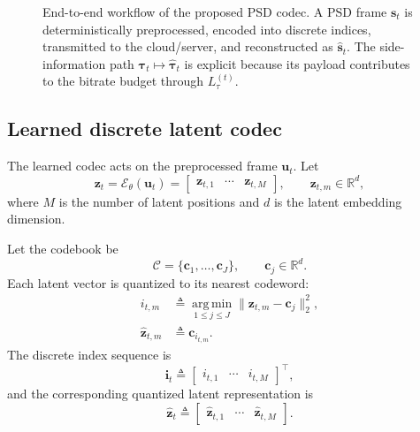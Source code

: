 \documentclass[11pt]{article}
\begin{document}
\begin{figure}[t]
\begin{tikzpicture}
\end{tikzpicture}
\caption{
End-to-end workflow of the proposed PSD codec. A PSD frame $\mathbf{s}_t$ is deterministically
preprocessed, encoded into discrete indices, transmitted to the cloud/server, and reconstructed as
$\hat{\mathbf{s}}_t$. The side-information path
$\boldsymbol{\tau}_t \mapsto \hat{\boldsymbol{\tau}}_t$ is explicit because its payload contributes
to the bitrate budget through $L_{\tau}^{(t)}$.
}
\label{fig:psdcodec_workflow}
\end{figure}

\subsection{Learned discrete latent codec}
The learned codec acts on the preprocessed frame $\mathbf{u}_t$. Let
\begin{equation}
\mathbf{z}_t
=
\mathcal{E}_{\theta}(\mathbf{u}_t)
=
\begin{bmatrix}
\mathbf{z}_{t,1} & \cdots & \mathbf{z}_{t,M}
\end{bmatrix},
\qquad
\mathbf{z}_{t,m} \in \mathbb{R}^{d},
\end{equation}
where $M$ is the number of latent positions and $d$ is the latent embedding dimension.

Let the codebook be
\begin{equation}
\mathcal{C}
=
\{\mathbf{c}_1,\ldots,\mathbf{c}_J\},
\qquad
\mathbf{c}_j \in \mathbb{R}^{d}.
\end{equation}
Each latent vector is quantized to its nearest codeword:
\begin{align}
i_{t,m}
&\triangleq
\operatorname*{arg\,min}_{1 \le j \le J}
\|\mathbf{z}_{t,m}-\mathbf{c}_j\|_2^2, \\
\hat{\mathbf{z}}_{t,m}
&\triangleq
\mathbf{c}_{i_{t,m}}.
\end{align}
The discrete index sequence is
\begin{equation}
\mathbf{i}_t
\triangleq
\begin{bmatrix}
i_{t,1} & \cdots & i_{t,M}
\end{bmatrix}^{\top},
\end{equation}
and the corresponding quantized latent representation is
\begin{equation}
\hat{\mathbf{z}}_t
\triangleq
\begin{bmatrix}
\hat{\mathbf{z}}_{t,1} & \cdots & \hat{\mathbf{z}}_{t,M}
\end{bmatrix}.
\end{equation}
\end{document}
